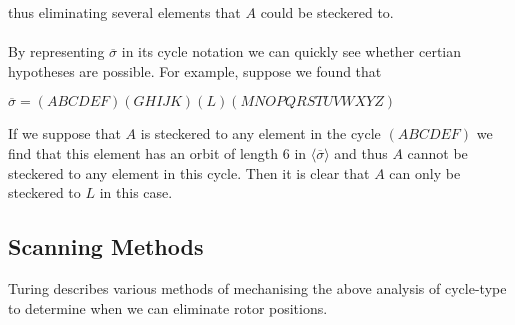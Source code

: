     thus eliminating several elements that $A$ could be steckered to. 
    \\\\By representing $\overline\sigma$ in its cycle notation we can quickly see whether certian hypotheses are possible. For example, 
    suppose we found that 
    \begin{center}
        $\overline\sigma = (ABCDEF)(GHIJK)(L)(MNOPQRSTUVWXYZ)$
    \end{center}
    If we suppose that $A$ is steckered to any element in the cycle $(ABCDEF)$ we find that this
    element has an orbit of length $6$ in $\langle\overline\sigma\rangle$ and thus $A$ cannot be steckered
    to any element in this cycle. Then it is clear that $A$ can only be steckered to $L$ in this case. 
    \subsection{Scanning Methods}
    Turing describes various methods of mechanising the above analysis of cycle-type to determine when we can eliminate rotor positions.

